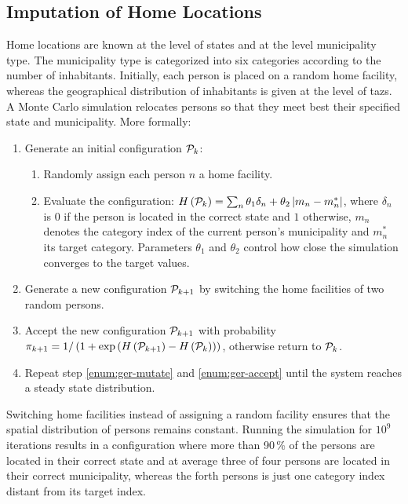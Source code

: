 \subsection{Imputation of Home Locations}
\label{ch:germany:imputation1}
Home locations are known at the level of states and at the level municipality type. The municipality type is categorized into six categories according to the number of inhabitants. Initially, each person is placed on a random home facility, whereas the geographical distribution of inhabitants is given at the level of \glspl{taz}. A Monte Carlo simulation relocates persons so that they meet best their specified state and municipality. More formally:

\begin{enumerate}
\item Generate an initial configuration ${\cal P}_k$:
\begin{enumerate}
\item Randomly assign each person $n$ a home facility.

\item Evaluate the configuration: $H\left( {\cal P}_k \right)= \sum_n \theta_1 \delta_n+ \theta_2 \left| m_n - m_{n}^* \right|$, where $\delta_n$ is $0$ if the person is located in the correct state and $1$ otherwise, $m_n$ denotes the category index of the current person's municipality and $m_{n}^*$ its target category. Parameters $\theta_1$ and $\theta_2$ control how close the simulation converges to the target values.

\end{enumerate}

\item \label{enum:ger-mutate} Generate a new configuration ${\cal P}_{k+1}$ by switching the home facilities of two random persons.

\item \label{enum:ger-accept} Accept the new configuration ${\cal P}_{k+1}$ with probability $\pi_{k+1} = 1 / \left( 1 + \exp \left(  H\left( {\cal P}_{k+1} \right) - H \left( {\cal P}_{k} \right) \right)\right)$, otherwise return to ${\cal P}_{k}$.

\item Repeat step \ref{enum:ger-mutate} and \ref{enum:ger-accept} until the system reaches a steady state distribution.
\end{enumerate}

Switching home facilities instead of assigning a random facility ensures that the spatial distribution of persons remains constant. Running the simulation for $10^9$ iterations results in a configuration where more than 90\,\% of the persons are located in their correct state and at average three of four persons are located in their correct municipality, whereas the forth persons is just one category index distant from its target index.

